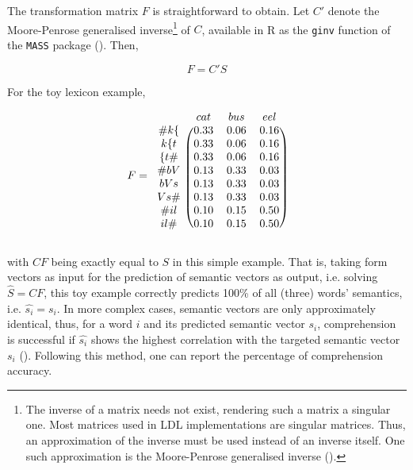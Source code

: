 The transformation matrix $F$ is straightforward to obtain. Let $C'$ denote the Moore-Penrose generalised inverse\footnote{The inverse of a matrix needs not exist, rendering such a matrix a singular one. Most matrices used in LDL implementations are singular matrices. Thus, an approximation of the inverse must be used instead of an inverse itself. One such approximation is the Moore-Penrose generalised inverse (\cite{Moore1920, Penrose1955}).} of $C$, available in R as the \texttt{ginv} function of the \texttt{MASS} package (\cite{Venables2002}). Then,

\begin{equation}
\label{eq:FCS}
    F=C'S
\end{equation}

For the toy lexicon example,

\begin{equation}
\label{eq:Fmat}
  F = 
    \begin{blockarray}{cccc}
        & cat & bus & eel \\
      \begin{block}{c(ccc)}
        {\#k\{} & 0.33 & 0.06 & 0.16 \\
        {k\{t} & 0.33 & 0.06 & 0.16 \\
        {\{t\#} & 0.33 & 0.06 & 0.16 \\
        {\#bV} & 0.13 & 0.33 & 0.03 \\
        {bVs} & 0.13 & 0.33 & 0.03 \\
        {Vs\#} & 0.13 & 0.33 & 0.03 \\
        {\#il} & 0.10 & 0.15 & 0.50 \\
        {il\#} & 0.10 & 0.15 & 0.50 \\
      \end{block}
    \end{blockarray}
\end{equation}

\noindent with $CF$ being exactly equal to $S$ in this simple example. That is, taking form vectors as input for the prediction of semantic vectors as output, i.e. solving 
$\hat{S}=CF$, this toy example correctly predicts 100\% of all (three) words’ semantics, i.e. $\hat{s_i}=s_i$. In more complex cases, semantic vectors are only approximately identical, thus, for a word $i$ and its predicted semantic vector $s_i$, comprehension is successful if $\hat{s_i}$ shows the highest correlation with the targeted semantic vector $s_i$ (\cite{Baayen2019}). Following this method, one can report the percentage of comprehension accuracy.

